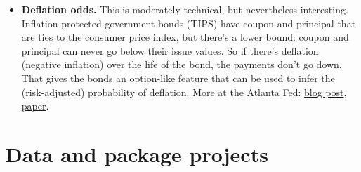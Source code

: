 \documentclass[11pt]{article}
\begin{document}
\begin{itemize}
\item {\bf Deflation odds.}
This is moderately technical, but nevertheless interesting.  Inflation-protected government bonds (TIPS) have coupon and principal that are ties to the consumer price index, but there’s a lower bound:  coupon and principal can never go below their issue values.  So if there’s deflation (negative inflation) over the life of the bond, the payments don’t go down.  That gives the bonds an option-like feature that can be used to infer the (risk-adjusted) probability of deflation.  More at the Atlanta Fed:
\href{http://macroblog.typepad.com/macroblog/2015/09/5-year-deflation-probability-moves-off-zero.html}
{blog post},
\href{https://www.frbatlanta.org/research/inflationproject/dp.aspx?d=1&s=blogmb}
{paper}.




\end{itemize}


\section*{Data and package projects}
\end{document}

